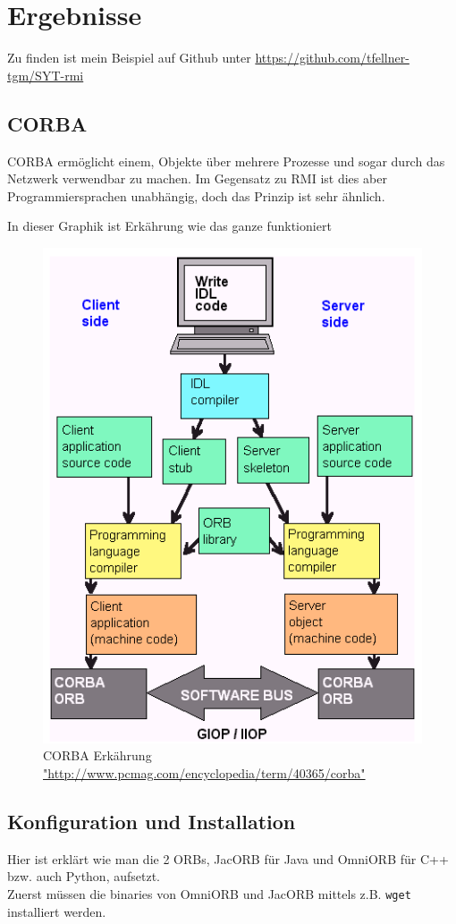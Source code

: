 
\section{Ergebnisse}
\label{sec:Ergebnisse}

Zu finden ist mein Beispiel auf Github unter \url{https://github.com/tfellner-tgm/SYT-rmi} \cite{repo}

\subsection{CORBA}

CORBA erm\"oglicht einem, Objekte \"uber mehrere Prozesse und sogar durch das Netzwerk verwendbar zu machen. Im Gegensatz zu RMI ist dies aber Programmiersprachen unabh\"angig, doch das Prinzip ist sehr \"ahnlich.

In dieser Graphik ist Erk\"ahrung wie das ganze funktioniert
\begin{figure}[!h]
        \begin{center}
                \includegraphics[width=0.5\linewidth]{images/corba_design.png}
                \caption{CORBA Erk\"ahrung \url{"http://www.pcmag.com/encyclopedia/term/40365/corba"}}
        \end{center}
\end{figure}

\clearpage

\subsection{Konfiguration und Installation}

Hier ist erkl\"art wie man die 2 ORBs, JacORB f\"ur Java und OmniORB f\"ur C++ bzw. auch Python, aufsetzt.
\\
Zuerst m\"ussen die binaries von OmniORB und JacORB mittels z.B. \texttt{wget} installiert werden. 

